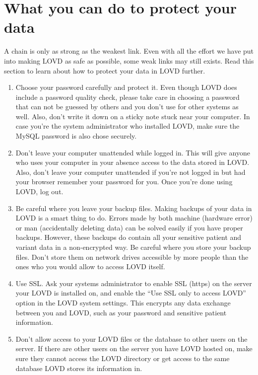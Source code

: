 \pagebreak
\section{What you can do to protect your data}
A chain is only as strong as the weakest link.
Even with all the effort we have put into making LOVD as safe as possible, some weak links may still exists.
Read this section to learn about how to protect your data in LOVD further.
\begin{enumerate}
  \item Choose your password carefully and protect it.
    Even though LOVD does include a password quality check, please take care in choosing a password that can not be guessed by others and you don't use for other systems as well.
    Also, don't write it down on a sticky note stuck near your computer.
    In case you're the system administrator who installed LOVD, make sure the MySQL password is also chose securely.
  \item Don't leave your computer unattended while logged in.
    This will give anyone who uses your computer in your absence access to the data stored in LOVD.
    Also, don't leave your computer unattended if you're not logged in but had your browser remember your password for you.
    Once you're done using LOVD, log out.
  \item Be careful where you leave your backup files.
    Making backups of your data in LOVD is a smart thing to do.
    Errors made by both machine (hardware error) or man (accidentally deleting data) can be solved easily if you have proper backups.
    However, these backups do contain all your sensitive patient and variant data in a non-encrypted way.
    Be careful where you store your backup files.
    Don't store them on network drives accessible by more people than the ones who you would allow to access LOVD itself.
  \item Use SSL.
    Ask your systems administrator to enable SSL (https) on the server your LOVD is installed on, and enable the ``Use SSL only to access LOVD'' option in the LOVD system settings.
    This encrypts any data exchange between you and LOVD, such as your password and sensitive patient information.
  \item Don't allow access to your LOVD files or the database to other users on the server.
    If there are other users on the server you have LOVD hosted on, make sure they cannot access the LOVD directory or get access to the same database LOVD stores its information in.
\end{enumerate}
\clearpage %










